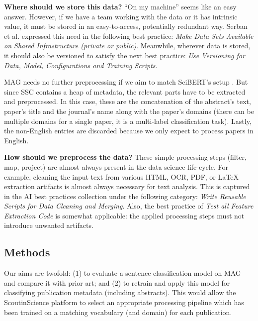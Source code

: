 \begin{displayquote}
\textbf{Where should we store this data?} ``On my machine'' seems like an easy answer. However, if we have a team working with the data or it has intrinsic value, it must be stored in an easy-to-access, potentially redundant way. Serban et al. \cite{serban2020adoption} expressed this need in the following best practice: \textit{Make Data Sets Available on Shared Infrastructure (private or public)}. Meanwhile, wherever data is stored, it should also be versioned to satisfy the next best practice: \textit{Use Versioning for Data, Model, Configurations and Training Scripts}.
\end{displayquote}

MAG needs no further preprocessing if we aim to match SciBERT's setup \cite{beltagy2019scibert}. But since SSC contains a heap of metadata, the relevant parts have to be extracted and preprocessed. In this case, these are the concatenation of the abstract's text, paper's title and the journal's name along with the paper's domains (there can be multiple domains for a single paper, it is a multi-label classification task). Lastly, the non-English entries are discarded because we only expect to process papers in  English.

\begin{displayquote}
\textbf{How should we preprocess the data?} These simple processing steps (filter, map, project) are almost always present in the data science life-cycle. For example, cleaning the input text from various HTML, OCR, PDF, or \LaTeX \hskip 0.12cm extraction artifacts is almost always necessary for text analysis. This is captured in the AI best practices collection under the following category: \textit{Write Reusable Scripts for Data Cleaning and Merging}. Also, the best practice of \textit{Test all Feature Extraction Code} is somewhat applicable: the applied processing steps must not introduce unwanted artifacts.
\end{displayquote}

\subsection{Methods}

Our aims are twofold: (1) to evaluate a sentence classification model on MAG and compare it with prior art; and (2) to retrain and apply this model for classifying publication metadata (including abstracts). This would allow the ScoutinScience platform to select an appropriate processing pipeline which has been trained on a matching vocabulary (and domain) for each publication. 

